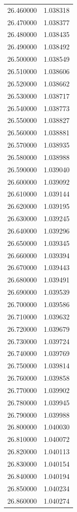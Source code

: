 \begin{tabular}{rr}
26.460000 & 1.038318 \\
26.470000 & 1.038377 \\
26.480000 & 1.038435 \\
26.490000 & 1.038492 \\
26.500000 & 1.038549 \\
26.510000 & 1.038606 \\
26.520000 & 1.038662 \\
26.530000 & 1.038717 \\
26.540000 & 1.038773 \\
26.550000 & 1.038827 \\
26.560000 & 1.038881 \\
26.570000 & 1.038935 \\
26.580000 & 1.038988 \\
26.590000 & 1.039040 \\
26.600000 & 1.039092 \\
26.610000 & 1.039144 \\
26.620000 & 1.039195 \\
26.630000 & 1.039245 \\
26.640000 & 1.039296 \\
26.650000 & 1.039345 \\
26.660000 & 1.039394 \\
26.670000 & 1.039443 \\
26.680000 & 1.039491 \\
26.690000 & 1.039539 \\
26.700000 & 1.039586 \\
26.710000 & 1.039632 \\
26.720000 & 1.039679 \\
26.730000 & 1.039724 \\
26.740000 & 1.039769 \\
26.750000 & 1.039814 \\
26.760000 & 1.039858 \\
26.770000 & 1.039902 \\
26.780000 & 1.039945 \\
26.790000 & 1.039988 \\
26.800000 & 1.040030 \\
26.810000 & 1.040072 \\
26.820000 & 1.040113 \\
26.830000 & 1.040154 \\
26.840000 & 1.040194 \\
26.850000 & 1.040234 \\
26.860000 & 1.040274 \\

\end{tabular}
